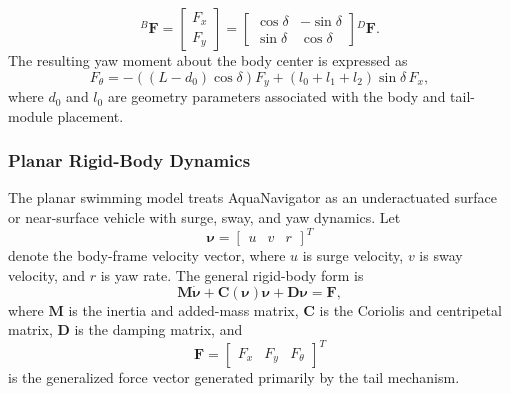 \documentclass{uhcoethesis}
\begin{document}
\begin{equation}
    {}^{B}\mathbf{F}
    =
    \begin{bmatrix}
        F_x \\ F_y
    \end{bmatrix}
    =
    \begin{bmatrix}
        \cos\delta & -\sin\delta \\
        \sin\delta & \cos\delta
    \end{bmatrix}
    {}^{D}\mathbf{F}.
    \label{eq:ch2_tail_force_body}
\end{equation}
The resulting yaw moment about the body center is expressed as
\begin{equation}
    F_{\theta}
    =
    -\left((L-d_0)\cos\delta\right)F_y
    + (l_0+l_1+l_2)\sin\delta\,F_x ,
    \label{eq:ch2_yaw_moment}
\end{equation}
where $d_0$ and $l_0$ are geometry parameters associated with the body and tail-module placement.

\subsubsection{Planar Rigid-Body Dynamics}

The planar swimming model treats AquaNavigator as an underactuated surface or near-surface vehicle with surge, sway, and yaw dynamics. Let
\begin{equation}
    \boldsymbol{\nu} =
    \begin{bmatrix}
        u & v & r
    \end{bmatrix}^T
    \label{eq:ch2_body_velocity}
\end{equation}
denote the body-frame velocity vector, where $u$ is surge velocity, $v$ is sway velocity, and $r$ is yaw rate. The general rigid-body form is
\begin{equation}
    \mathbf{M}\dot{\boldsymbol{\nu}}
    + \mathbf{C}(\boldsymbol{\nu})\boldsymbol{\nu}
    + \mathbf{D}\boldsymbol{\nu}
    =
    \mathbf{F},
    \label{eq:ch2_general_fish_model}
\end{equation}
where $\mathbf{M}$ is the inertia and added-mass matrix, $\mathbf{C}$ is the Coriolis and centripetal matrix, $\mathbf{D}$ is the damping matrix, and
\begin{equation}
    \mathbf{F} =
    \begin{bmatrix}
        F_x & F_y & F_{\theta}
    \end{bmatrix}^T
    \label{eq:ch2_fish_force_vector}
\end{equation}
is the generalized force vector generated primarily by the tail mechanism.
\end{document}
